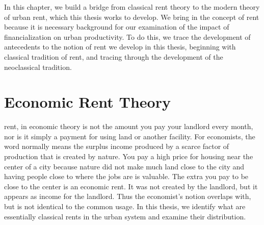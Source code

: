 In this chapter, we build a bridge from \gls{classical rent theory} to the modern theory of urban rent, which this thesis works to develop. 
We bring in the concept of rent because it is necessary background for our examination of the impact of \gls{financialization} on urban productivity. To do this, we trace the development of antecedents to the notion of rent we develop in this thesis, beginning with classical tradition of rent, and tracing through the development of the neoclassical tradition. 


\section{Economic Rent Theory} 

\Gls{rent}, in economic theory is not the amount you pay your landlord every month, nor is it simply a payment for using land or another facility.  For economists, the word normally means the  \gls{surplus} income produced by a scarce factor of production that is created by nature. You pay a high price for housing near the center of a city because nature did not make much land close to the city and having people close to where the jobs are is valuable. The extra you pay to be close to the center is an economic rent. It was not created by the landlord, but it appears as income for the landlord.  Thus the economist's notion overlaps with, but is not identical to the common usage. In this thesis, we identify what are essentially classical rents in the urban system and examine their distribution.  



